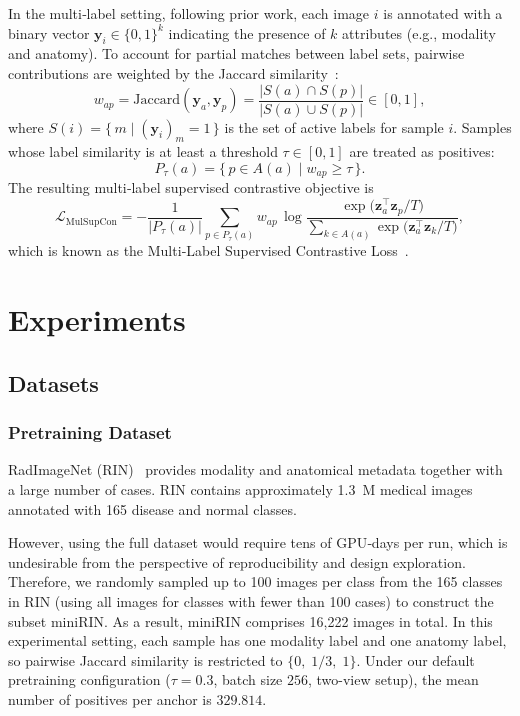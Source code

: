 \documentclass[final,1p,times]{elsarticle}
\newcommand{\revadd}[1]{#1}
\begin{document}
In the multi‑label setting, following prior work, each image $i$ is annotated with a binary vector $\mathbf y_i \in \{0,1\}^{k}$ indicating the presence of $k$ attributes (e.g., modality and anatomy). To account for partial matches between label sets, pairwise contributions are weighted by the Jaccard similarity~\cite{zaigrajew_contrastive_2022}:
\[
  w_{ap}
  = \mathrm{Jaccard}(\mathbf y_a,\mathbf y_p)
  = \frac{\lvert S(a)\cap S(p)\rvert}{\lvert S(a)\cup S(p)\rvert}
  \in [0,1],
\]
where $S(i)=\{\,m\mid (\mathbf y_i)_m=1\,\}$ is the set of active labels for sample $i$. Samples whose label similarity is at least a threshold $\tau \in [0,1]$ are treated as positives:
\[
  P_{\tau}(a)=\{\,p \in A(a)\mid w_{ap}\ge \tau\,\}.
\]
The resulting multi‑label supervised contrastive objective is
\begin{equation}
  \mathcal{L}_{\mathrm{MulSupCon}}
  = -\frac{1}{\lvert P_{\tau}(a)\rvert}
    \sum_{p\in P_{\tau}(a)}
    w_{ap}\,
    \log
    \frac{\exp\!\bigl(\mathbf z_a^{\top}\mathbf z_p/T\bigr)}
         {\displaystyle\sum_{k\in A(a)}
          \exp\!\bigl(\mathbf z_a^{\top}\mathbf z_k/T\bigr)} ,
  \label{eq:supcon-ja}
\end{equation}
which is known as the Multi‑Label Supervised Contrastive Loss~\cite{zaigrajew_contrastive_2022}.

\section{Experiments}
\subsection{Datasets}
\subsubsection{Pretraining Dataset}
\label{ssec:dataset-ja}
RadImageNet (RIN)~\cite{mei_radimagenet_2022} provides modality and anatomical metadata together with a large number of cases.
RIN contains approximately 1.3~M medical images annotated with 165 disease and normal classes.

However, using the full dataset would require tens of GPU‑days per run, which is undesirable from the perspective of reproducibility and design exploration.
Therefore, we randomly sampled up to 100 images per class from the 165 classes in RIN (using all images for classes with fewer than 100 cases)
to construct the subset miniRIN. As a result, miniRIN comprises 16,222 images in total.
\revadd{In this experimental setting, each sample has one modality label and one anatomy label, so pairwise Jaccard similarity is restricted to \(\{0,\;1/3,\;1\}\).}
\revadd{Under our default pretraining configuration (\(\tau=0.3\), batch size \(256\), two-view setup), the mean number of positives per anchor is \(329.814\).}
\end{document}
